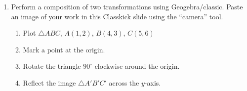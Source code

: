 \documentclass[12pt, twoside]{article}
\begin{document}
\begin{enumerate}
\newpage
\item Perform a composition of two transformations using Geogebra/classic. Paste an image of your work in this Classkick slide using the ``camera'' tool.
  \begin{enumerate}
    \item Plot $\triangle ABC$, $A(1,2)$, $B(4,3)$, $C(5,6)$
    \item Mark a point at the origin.
    \item Rotate the triangle $90^\circ$ clockwise around the origin.
    \item Reflect the image $\triangle A'B'C'$ across the $y$-axis.
  \end{enumerate}
    
\end{enumerate}
\end{document}

